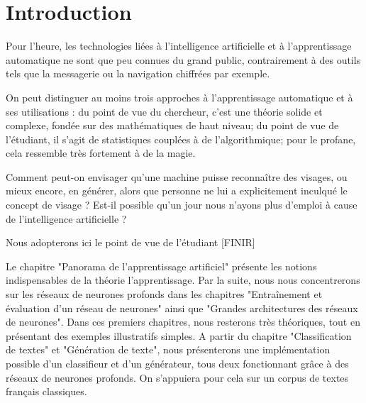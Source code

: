 \chapter*{Introduction}

Pour l'heure, les technologies liées à l'intelligence artificielle et à l'apprentissage automatique ne sont que peu connues du grand public, contrairement à des outils tels que la messagerie ou la navigation chiffrées par exemple.

On peut distinguer au moins trois approches à l'apprentissage automatique et à ses utilisations : du point de vue du chercheur, c'est une théorie solide et complexe, fondée sur des mathématiques de haut niveau; du point de vue de l'étudiant, il s'agit de statistiques couplées à de l'algorithmique; pour le profane, cela ressemble très fortement à de la magie. 

Comment peut-on envisager qu'une machine puisse reconnaître des visages, ou mieux encore, en générer, alors que personne ne lui a explicitement inculqué le concept de visage ? Est-il possible qu'un jour nous n'ayons plus d'emploi à cause de l'intelligence artificielle ?

Nous adopterons ici le point de vue de l'étudiant [FINIR]

Le chapitre "Panorama de l'apprentissage artificiel" présente les notions indispensables de la théorie l'apprentissage. Par la suite, nous nous concentrerons sur les réseaux de neurones profonds dans les chapitres "Entraînement et évaluation d'un réseau de neurones" ainsi que "Grandes architectures des réseaux de neurones". Dans ces premiers chapitres, nous resterons très théoriques, tout en présentant des exemples illustratifs simples. A partir du chapitre "Classification de textes" et "Génération de texte", nous présenterons une implémentation possible d'un classifieur et d'un générateur, tous deux fonctionnant grâce à des réseaux de neurones profonds. On s'appuiera pour cela sur un corpus de textes français classiques.